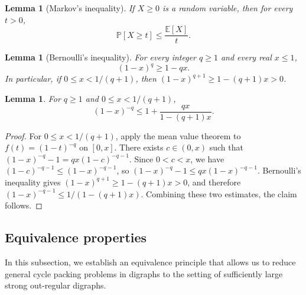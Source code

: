 \documentclass[a4paper,12pt]{article}
\newtheorem{lemma}[theorem]{Lemma}
\numberwithin{equation}{section}
\begin{document}
\begin{lemma}[Markov's inequality]\label{lem:markov}
If $X\ge0$ is a random variable, then for every $t>0$,
$$
\mathbb P[X\ge t]\le\frac{\mathbb E[X]}{t}.
$$
\end{lemma}




\begin{lemma}[Bernoulli's inequality]\label{lem:bernoulli}
For every integer $q\ge1$ and every real $x\le1$,
$$
(1-x)^q\ge1-qx.
$$
In particular, if $0\le x<1/(q+1)$, then
$(1-x)^{q+1}\ge1-(q+1)x>0$.
\end{lemma}


\begin{lemma}\label{lem:mvt}
For $q\ge1$ and $0\le x<1/(q+1)$,
$$
(1-x)^{-q}\le1+\frac{qx}{1-(q+1)x}.
$$
\end{lemma}
\begin{proof}
For $0\le x<1/(q+1)$, apply the mean value theorem to $f(t)=(1-t)^{-q}$ on $[0,x]$. There exists $c\in(0,x)$ such that
$
(1-x)^{-q}-1 = qx(1-c)^{-q-1}.
$
Since $0<c<x$, we have $(1-c)^{-q-1}\le (1-x)^{-q-1}$, so
$
(1-x)^{-q}-1\le qx(1-x)^{-q-1}.
$
Bernoulli's inequality gives $(1-x)^{q+1}\ge1-(q+1)x>0$, and therefore
$(1-x)^{-q-1}\le1/(1-(q+1)x)$. Combining these two estimates, the claim follows.
\end{proof}


\subsection{Equivalence properties}\label{subsec:equivalence}

In this subsection, we establish an equivalence principle that allows us to reduce general cycle packing problems in digraphs to the setting of sufficiently large strong out-regular digraphs.
\end{document}
